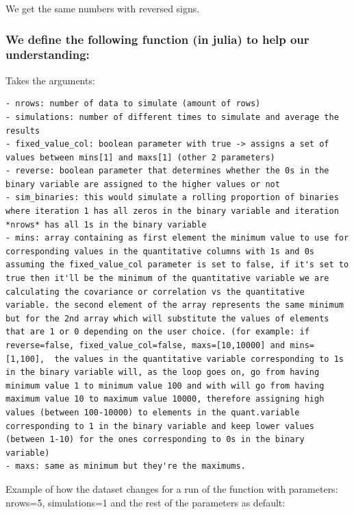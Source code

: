 \documentclass[]{article}
\begin{document}
We get the same numbers with reversed signs.

\newpage

\hypertarget{we-define-the-following-function-in-julia-to-help-our-understanding}{%
\subsubsection{We define the following function (in julia) to help our
understanding:}\label{we-define-the-following-function-in-julia-to-help-our-understanding}}

Takes the arguments:

\begin{verbatim}
- nrows: number of data to simulate (amount of rows)
- simulations: number of different times to simulate and average the results
- fixed_value_col: boolean parameter with true -> assigns a set of values between mins[1] and maxs[1] (other 2 parameters)
- reverse: boolean parameter that determines whether the 0s in the binary variable are assigned to the higher values or not
- sim_binaries: this would simulate a rolling proportion of binaries where iteration 1 has all zeros in the binary variable and iteration *nrows* has all 1s in the binary variable
- mins: array containing as first element the minimum value to use for corresponding values in the quantitative columns with 1s and 0s assuming the fixed_value_col parameter is set to false, if it's set to true then it'll be the minimum of the quantitative variable we are calculating the covariance or correlation vs the quantitative variable. the second element of the array represents the same minimum but for the 2nd array which will substitute the values of elements that are 1 or 0 depending on the user choice. (for example: if reverse=false, fixed_value_col=false, maxs=[10,10000] and mins=[1,100],  the values in the quantitative variable corresponding to 1s in the binary variable will, as the loop goes on, go from having minimum value 1 to minimum value 100 and with will go from having maximum value 10 to maximum value 10000, therefore assigning high values (between 100-10000) to elements in the quant.variable corresponding to 1 in the binary variable and keep lower values (between 1-10) for the ones corresponding to 0s in the binary variable)
- maxs: same as minimum but they're the maximums.
\end{verbatim}

Example of how the dataset changes for a run of the function with
parameters: nrows=5, simulations=1 and the rest of the parameters as
default:
\end{document}

